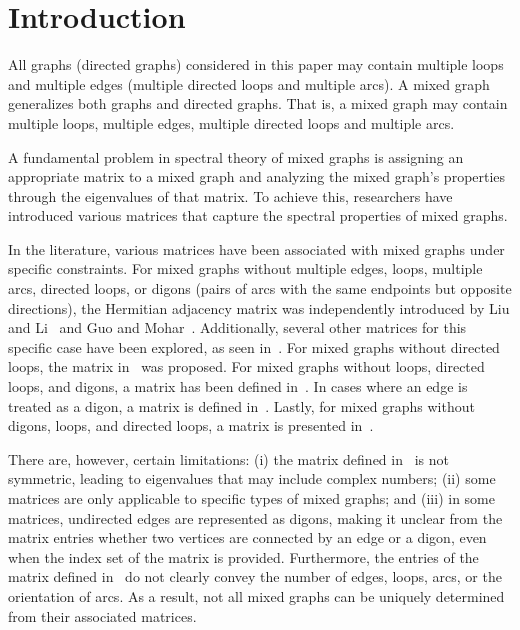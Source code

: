 \documentclass[12pt]{article}
\numberwithin{equation}{section}
\begin{document}
	\section{Introduction}
	
All graphs (directed graphs) considered in this paper may contain multiple loops and multiple edges (multiple directed loops and multiple arcs). A mixed graph generalizes both graphs and directed graphs. That is, a mixed graph may contain multiple loops, multiple edges, multiple directed loops and  multiple arcs. 

A fundamental problem in spectral theory  of mixed graphs  is assigning an appropriate matrix to a mixed graph and analyzing the mixed graph's properties through the eigenvalues of that matrix. To achieve this,  researchers have introduced various  matrices that capture the spectral properties of mixed graphs. 


In the literature, various matrices have been associated with mixed graphs under specific constraints. For mixed graphs without multiple edges, loops, multiple arcs, directed loops, or digons (pairs of arcs with the same endpoints but opposite directions), the Hermitian adjacency matrix was independently introduced by Liu and Li~\cite{Liu2015hermitian} and Guo and Mohar~\cite{guo2017hermitian}. Additionally, several other matrices for this specific case have been explored, as seen in~\cite{abudayah2022hermitian,Adiga2016mixed,Alomari2022signless,Wang2024index,Xiong2023principal,Yu2019Hermitian,Yu2017singularity,Yu2015hermitian,Yu2023k}. For mixed graphs without directed loops, the matrix in~\cite{Bapat1999generalized} was proposed. For mixed graphs without loops, directed loops, and digons, a matrix has been defined in~\cite{guo2017hermitian}. In cases where an edge is treated as a digon, a matrix is defined in~\cite{Mohar2020new}. Lastly, for mixed graphs without digons, loops, and directed loops, a matrix is presented in~\cite{Yuan2022hermitian}.

There are, however, certain limitations: (i) the matrix defined in~\cite{Adiga2016mixed} is not symmetric, leading to eigenvalues that may include complex numbers; (ii) some matrices are only applicable to specific types of mixed graphs; and (iii) in some matrices, undirected edges are represented as digons, making it unclear from the matrix entries whether two vertices are connected by an edge or a digon, even when the index set of the matrix is provided. Furthermore, the entries of the matrix defined in~\cite{Bapat1999generalized} do not clearly convey the number of edges, loops, arcs, or the orientation of arcs. As a result, not all mixed graphs can be uniquely determined from their associated matrices. 
\end{document}
